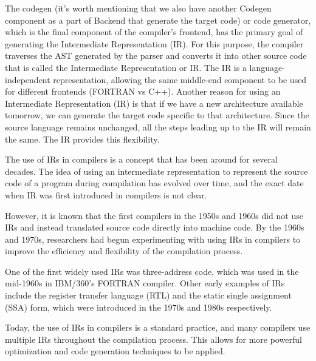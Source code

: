 
The codegen (it's worth mentioning that we also have another Codegen component as a part of Backend that generate the target code) or code generator, which is the final component of the compiler's frontend, has the primary goal of generating the Intermediate Representation (IR). For this purpose, the compiler traverses the AST generated by the parser and converts it into other source code that is called the Intermediate Representation or IR. The IR is a language-independent representation, allowing the same middle-end component to be used for different frontends (FORTRAN vs C++). Another reason for using an Intermediate Representation (IR) is that if we have a new architecture available tomorrow, we can generate the target code specific to that architecture. Since the source language remains unchanged, all the steps leading up to the IR will remain the same. The IR provides this flexibility.

The use of IRs in compilers is a concept that has been around for several decades. The idea of using an intermediate representation to represent the source code of a program during compilation has evolved over time, and the exact date when IR was first introduced in compilers is not clear.

However, it is known that the first compilers in the 1950s and 1960s did not use IRs and instead translated source code directly into machine code. By the 1960s and 1970s, researchers had begun experimenting with using IRs in compilers to improve the efficiency and flexibility of the compilation process.

One of the first widely used IRs was three-address code, which was used in the mid-1960s in IBM/360's FORTRAN compiler. Other early examples of IRs include the register transfer language (RTL) and the static single assignment (SSA) form, which were introduced in the 1970s and 1980s respectively.

Today, the use of IRs in compilers is a standard practice, and many compilers use multiple IRs throughout the compilation process. This allows for more powerful optimization and code generation techniques to be applied.




































